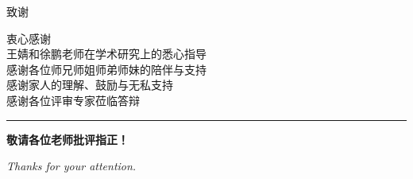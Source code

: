 \begin{frame}{致\quad 谢}

  \begin{center}
    \vspace{0.5em}
    {\large 衷心感谢\\[0.5em]}
    {\large 王婧和徐鹏老师在学术研究上的悉心指导\\[0.4em]}
    {\large 感谢各位师兄师姐师弟师妹的陪伴与支持\\[0.4em]}
    {\large 感谢家人的理解、鼓励与无私支持\\[0.4em]}
    {\large 感谢各位评审专家莅临答辩\\[1.5em]}

    \rule{0.5\textwidth}{0.4pt}
    \vspace{1em}

    {\LARGE \textbf{敬请各位老师批评指正！}}

    \vspace{1.5em}
    {\large \textit{Thanks for your attention.}}
  \end{center}

\end{frame}
